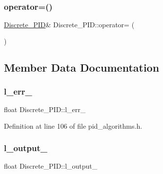 \mbox{\label{class_discrete___p_i_d_ae529dc65772963250ff74e0f5b579bcd}} 
\subsubsection{\texorpdfstring{operator=()}{operator=()}\hspace{0.1cm}{\footnotesize\ttfamily [2/2]}}
{\footnotesize\ttfamily \mbox{\hyperlink{class_discrete___p_i_d}{Discrete\+\_\+\+P\+ID}}\& Discrete\+\_\+\+P\+I\+D\+::operator= (\begin{DoxyParamCaption}\item[{const \mbox{\hyperlink{class_discrete___p_i_d}{Discrete\+\_\+\+P\+ID}} \&}]{ }\end{DoxyParamCaption})\hspace{0.3cm}{\ttfamily [default]}}



\subsection{Member Data Documentation}
\mbox{\label{class_discrete___p_i_d_a20866866cf564262c74dabef26cc0372}} 
\subsubsection{\texorpdfstring{l\_err\_}{l\_err\_}}
{\footnotesize\ttfamily float Discrete\+\_\+\+P\+I\+D\+::l\+\_\+err\+\_\+\hspace{0.3cm}{\ttfamily [private]}}



Definition at line 106 of file pid\+\_\+algorithms.\+h.

\mbox{\label{class_discrete___p_i_d_a1eecb5b2126d7f6787db1004f6d17632}} 
\subsubsection{\texorpdfstring{l\_output\_}{l\_output\_}}
{\footnotesize\ttfamily float Discrete\+\_\+\+P\+I\+D\+::l\+\_\+output\+\_\+\hspace{0.3cm}{\ttfamily [private]}}



